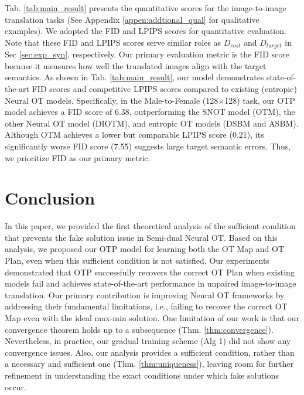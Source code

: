 Tab. \ref{tab:main_result} presents the quantitative scores for the image-to-image translation tasks (See Appendix \ref{appen:addtional_qual} for qualitative examples). We adopted the FID \citep{fid} and LPIPS \citep{lpips} scores for quantitative evaluation. Note that these FID and LPIPS scores serve similar roles as $D_{cost}$ and $D_{target}$ in Sec \ref{sec:exp_syn}, respectively. 
Our primary evaluation metric is the FID score because it measures how well the translated images align with the target semantics.
As shown in Tab. \ref{tab:main_result}, our model demonstrates state-of-the-art FID scores and competitive LPIPS scores compared to existing (entropic) Neural OT models. Specifically, in the Male-to-Female (128$\times$128) task, our OTP model achieves a FID score of 6.38, outperforming the SNOT model (OTM), the other Neural OT model (DIOTM), and entropic OT models (DSBM and ASBM). Although OTM achieves a lower but comparable LPIPS score (0.21), its significantly worse FID score (7.55) suggests large target semantic errors. Thus, we prioritize FID as our primary metric.

\section{Conclusion}
In this paper, we provided the first theoretical analysis of the sufficient condition that prevents the fake solution issue in Semi-dual Neural OT. Based on this analysis, we proposed our OTP model for learning both the OT Map and OT Plan, even when this sufficient condition is not satisfied. Our experiments demonstrated that OTP successfully recovers the correct OT Plan when existing models fail and achieves state-of-the-art performance in unpaired image-to-image translation. 
Our primary contribution is improving Neural OT frameworks by addressing their fundamental limitations, i.e., failing to recover the correct OT Map even with the ideal max-min solution. 
One limitation of our work is that our convergence theorem holds up to a subsequence (Thm. \ref{thm:convergence}). Nevertheless, in practice, our gradual training scheme (Alg 1) did not show any convergence issues. Also, our analysis provides a sufficient condition, rather than a necessary and sufficient one (Thm. \ref{thm:uniqueness}), leaving room for further refinement in understanding the exact conditions under which fake solutions occur.
